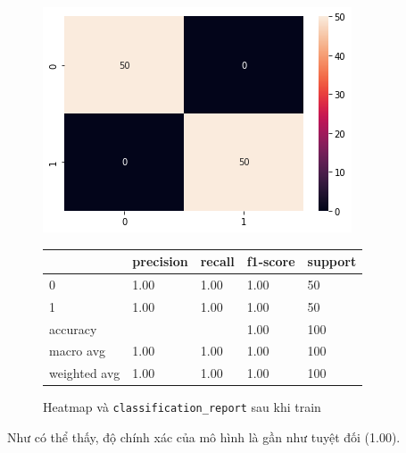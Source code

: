 \documentclass[12pt]{article}
\begin{document}
\begin{figure}[H]
\begin{multicols}{2}
\includegraphics[scale=.5]{img/train-result.png}

\begin{table}[H]
\begin{tabular}{l l l l l}
\hline
 & precision & recall & f1-score & support \\
\hline
0 & 1.00 & 1.00 & 1.00 & 50 \\
1 & 1.00 & 1.00 & 1.00 & 50 \\
accuracy &   &   & 1.00 & 100 \\
macro avg & 1.00 & 1.00 & 1.00 & 100 \\
weighted avg & 1.00 & 1.00 & 1.00 & 100 \\
\hline
\end{tabular}
\end{table}
\end{multicols}
\label{fig:heatmap_testing}
\caption{Heatmap và \texttt{classification\_report} sau khi train}
\end{figure}
Như có thể thấy, độ chính xác của mô hình là gần như tuyệt đối (1.00).
\end{document}
